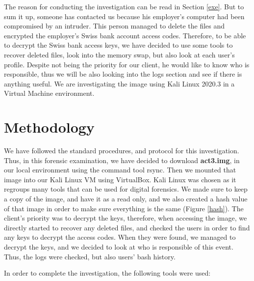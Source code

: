 \documentclass[a4paper,12pt]{article}
\begin{document}
The reason for conducting the investigation can be read in Section \ref{exe}. But to sum it up, someone has contacted us because his employer's computer had been compromised by an intruder. This person managed to delete the files and encrypted the employer's Swiss bank account access codes. Therefore, to be able to decrypt the Swiss bank access keys, we have decided to use some tools to recover deleted files, look into the memory swap, but also look at each user's profile. Despite not being the priority for our client, he would like to know who is responsible, thus we will be also looking into the logs section and see if there is anything useful. We are investigating the image using Kali Linux 2020.3 in a Virtual Machine environment.  

\section{Methodology}


We have followed the standard procedures, and protocol for this investigation. Thus, in this forensic examination, we have decided to download \textbf{act3.img}, in our local environment using the command tool rsync. Then we mounted that image into our Kali Linux VM using VirtualBox. Kali Linux was chosen as it regroups many tools that can be used for digital forensics. We made sure to keep a copy of the image, and have it as a read only, and we also created a hash value of that image in order to make sure everything is the same (Figure \ref{hash}). The client's priority was to decrypt the keys, therefore, when accessing the image, we directly started to recover any deleted files, and checked the users in order to find any keys to decrypt the access codes. When they were found, we managed to decrypt the keys, and we decided to look at who is responsible of this event. Thus, the logs were checked, but also users' bash history.  

In order to complete the investigation, the following tools were used: 
\end{document}
